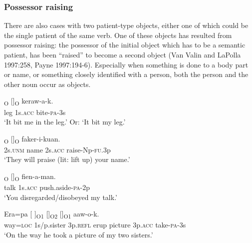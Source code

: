 \subsubsection[Possessor raising]{Possessor raising}
\hypertarget{RefHeading22061935131865}{}
There are also cases with two patient-type objects, either one of which could be the single patient of the same verb. One of these objects has resulted from possessor raising: the possessor of the initial object  which has to be a semantic patient, has been ``raised'' to become a second object (Van Valin and LaPolla 1997:258, Payne 1997:194-6). Especially when something is done to a body part or name, or something closely identified with a person, both the person and the other noun occur as objects.

\ea%
\label{ex:x951}
\textsubscript{O} []\textsubscript{O}  keraw-a-k. \\
     leg  1s.\textsc{acc}  bite-\textsc{pa}-3s \\
\glt `It bit me in the leg.' Or: `It bit my leg.'
\z

\ea%
\label{ex:x952}
\textsubscript{O}  []\textsubscript{O}  faker-i-kuan. \\
     2s.\textsc{unm}  name  2s.\textsc{acc}  raise-Np-\textsc{fu}.3p \\
\glt `They will praise (lit: lift up) your name.'
\z

\ea%
\label{ex:x957}
\textsubscript{O}  []\textsubscript{O}  fien-a-man. \\
     talk  1s.\textsc{acc}  push.aside-\textsc{pa}-2p \\
\glt `You disregarded/disobeyed my talk.'
\z

\ea%
\label{ex:x948}
\gll Era=pa  [  ]\textsubscript{O1}  []\textsubscript{O2}  []\textsubscript{O1} aaw-o-k. \\
     way=\textsc{loc}  1s/p.sister  3p.\textsc{refl}  erup  picture  3p.\textsc{acc} take-\textsc{pa}-3s \\
\glt `On the way he took a picture of my two sisters.'
\z

